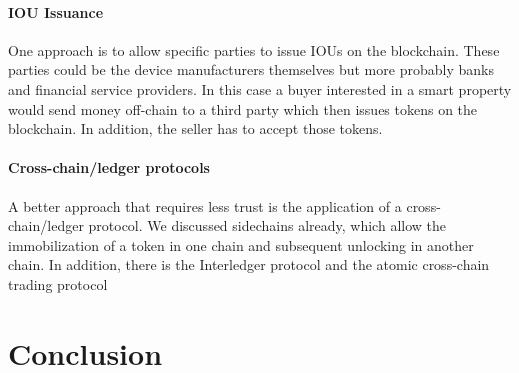 \paragraph{IOU Issuance}
One approach is to allow specific parties to issue IOUs on the blockchain. These parties could be the device manufacturers themselves but more probably banks and financial service providers. In this case a buyer interested in a smart property would send money off-chain to a third party which then issues tokens on the blockchain. In addition, the seller has to accept those tokens. 

\paragraph{Cross-chain/ledger protocols}
A better approach that requires less trust is the application of a cross-chain/ledger protocol. We discussed sidechains already, which allow the immobilization of a token in one chain and subsequent unlocking in another chain. In addition, there is the Interledger protocol \cite{hope2016interledger} and the atomic cross-chain trading protocol \cite{atomiccrosschaintrading}




\section{Conclusion}

